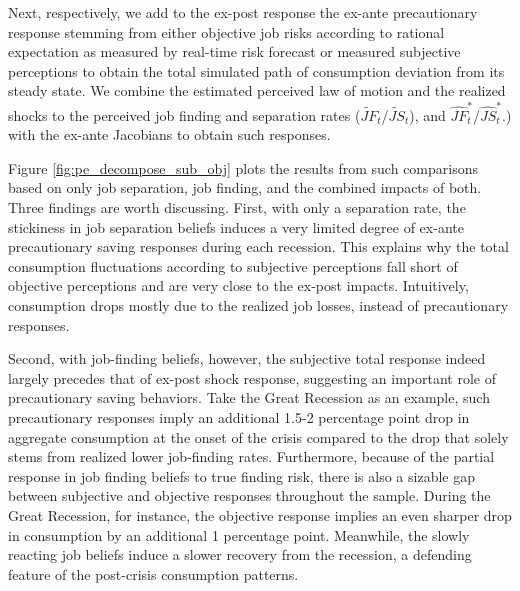 Next, respectively, we add to the ex-post response the ex-ante precautionary response stemming from either objective job risks according to rational expectation as measured by real-time risk forecast or measured subjective perceptions to obtain the total simulated path of consumption deviation from its steady state. We combine the estimated perceived law of motion and the realized shocks to the perceived job finding and separation rates ($\widetilde{JF}_t$/$\widetilde{JS}_t$), and $\widehat{JF}^*_t$/$ \widehat{JS}^*_t$.) with the ex-ante Jacobians to obtain such responses.   

Figure \ref{fig:pe_decompose_sub_obj} plots the results from such comparisons based on only job separation, job finding, and the combined impacts of both. Three findings are worth discussing. First, with only a separation rate, the stickiness in job separation beliefs induces a very limited degree of ex-ante precautionary saving responses during each recession. This explains why the total consumption fluctuations according to subjective perceptions fall short of objective perceptions and are very close to the ex-post impacts. Intuitively, consumption drops mostly due to the realized job losses, instead of precautionary responses. 

Second, with job-finding beliefs, however, the subjective total response indeed largely precedes that of ex-post shock response, suggesting an important role of precautionary saving behaviors. Take the Great Recession as an example, such precautionary responses imply an additional 1.5-2 percentage point drop in aggregate consumption at the onset of the crisis compared to the drop that solely stems from realized lower job-finding rates. Furthermore, because of the partial response in job finding beliefs to true finding risk, there is also a sizable gap between subjective and objective responses throughout the sample. During the Great Recession, for instance, the objective response implies an even sharper drop in consumption by an additional 1 percentage point. Meanwhile, the slowly reacting job beliefs induce a slower recovery from the recession, a defending feature of the post-crisis consumption patterns.   

